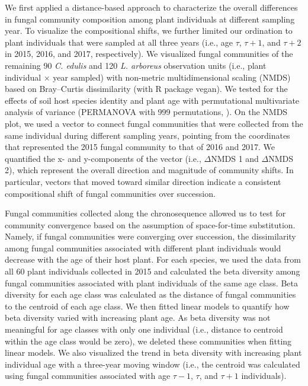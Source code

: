 We first applied a distance-based approach to characterize the overall differences in fungal community composition among plant individuals at different sampling year. 
To visualize the compositional shifts, we further limited our ordination to plant individuals that were sampled at all three years (i.e., age $\tau$, $\tau + 1$, and $\tau + 2$ in 2015, 2016, and 2017, respectively). 
We visualized fungal communities of the remaining 90 \textit{C. edulis} and 120 \textit{L. arboreus} observation units (i.e., plant individual $\times$ year sampled) with non-metric multidimensional scaling (NMDS) based on Bray--Curtis dissimilarity (with R package vegan). We tested for the effects of soil host species identity and plant age with permutational multivariate analysis of variance (PERMANOVA with 999 permutations, \citealp{Anderson2011}). 
On the NMDS plot, we used a vector to connect fungal communities that were collected from the same individual during different sampling years, pointing from the coordinates that represented the 2015 fungal community to that of 2016 and 2017. We quantified the x- and y-components of the vector (i.e., $\Delta$NMDS 1 and $\Delta$NMDS 2), which represent the overall direction and magnitude of community shifts. In particular, vectors that moved toward similar direction indicate a consistent compositional shift of fungal communities over succession.
\par


Fungal communities collected along the chronosequence allowed us to test for community convergence based on the assumption of space-for-time substitution. Namely, if fungal communities were converging over succession, the dissimilarity among fungal communities associated with different plant individuals would decrease with the age of their host plant. 
For each species, we used the data from all 60 plant individuals collected in 2015 and calculated the beta diversity among fungal communities associated with plant individuals of the same age class. Beta diversity for each age class was calculated as the distance of fungal communities to the centroid of each age class.
We then fitted linear models to quantify how beta diversity varied with increasing plant age.
As beta diversity was not meaningful for age classes with only one individual (i.e., distance to centroid within the age class would be zero), we deleted these communities when fitting linear models. 
We also visualized the trend in beta diversity with increasing plant individual age with a three-year moving window (i.e., the centroid was calculated using fungal communities associated with age $\tau - 1$, $\tau$, and $\tau + 1$ individuals).
\par



